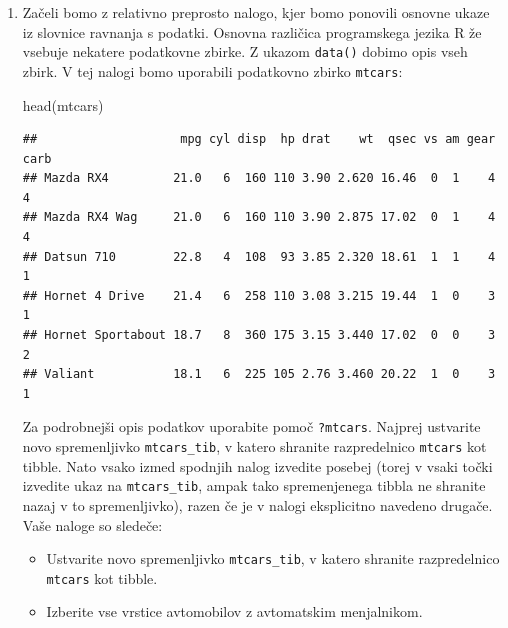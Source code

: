 \documentclass[
]{book}
\newenvironment{Shaded}{\begin{snugshade}}{\end{snugshade}}
\newcommand{\FunctionTok}[1]{\textcolor[rgb]{0.00,0.00,0.00}{#1}}
\newcommand{\NormalTok}[1]{#1}
\providecommand{\tightlist}{%
  \setlength{\itemsep}{0pt}\setlength{\parskip}{0pt}}
\begin{document}
\begin{enumerate}
\def\labelenumi{\arabic{enumi})}
\item
  Začeli bomo z relativno preprosto nalogo, kjer bomo ponovili osnovne ukaze iz slovnice ravnanja s podatki. Osnovna različica programskega jezika R že vsebuje nekatere podatkovne zbirke. Z ukazom \texttt{data()} dobimo opis vseh zbirk. V tej nalogi bomo uporabili podatkovno zbirko \texttt{mtcars}:

\begin{Shaded}
\begin{Highlighting}[]
\FunctionTok{head}\NormalTok{(mtcars)}
\end{Highlighting}
\end{Shaded}

\begin{verbatim}
##                    mpg cyl disp  hp drat    wt  qsec vs am gear carb
## Mazda RX4         21.0   6  160 110 3.90 2.620 16.46  0  1    4    4
## Mazda RX4 Wag     21.0   6  160 110 3.90 2.875 17.02  0  1    4    4
## Datsun 710        22.8   4  108  93 3.85 2.320 18.61  1  1    4    1
## Hornet 4 Drive    21.4   6  258 110 3.08 3.215 19.44  1  0    3    1
## Hornet Sportabout 18.7   8  360 175 3.15 3.440 17.02  0  0    3    2
## Valiant           18.1   6  225 105 2.76 3.460 20.22  1  0    3    1
\end{verbatim}

  Za podrobnejši opis podatkov uporabite pomoč \texttt{?mtcars}. Najprej ustvarite novo spremenljivko \texttt{mtcars\_tib}, v katero shranite razpredelnico \texttt{mtcars} kot tibble. Nato vsako izmed spodnjih nalog izvedite posebej (torej v vsaki točki izvedite ukaz na \texttt{mtcars\_tib}, ampak tako spremenjenega tibbla ne shranite nazaj v to spremenljivko), razen če je v nalogi eksplicitno navedeno drugače. Vaše naloge so sledeče:

  \begin{itemize}
  \tightlist
  \item
    Ustvarite novo spremenljivko \texttt{mtcars\_tib}, v katero shranite razpredelnico \texttt{mtcars} kot tibble.
  \item
    Izberite vse vrstice avtomobilov z avtomatskim menjalnikom.
  \end{itemize}


\end{enumerate}
\end{document}
